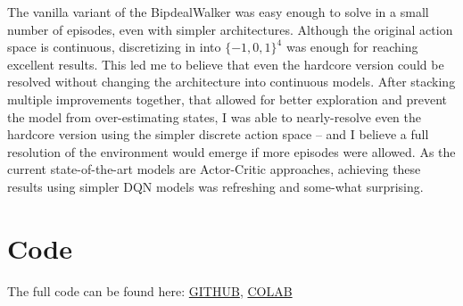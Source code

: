 \documentclass{article}
\begin{document}
\begin{multicols}{2}
The vanilla variant of the BipdealWalker was easy enough to solve in a small number of episodes, even with simpler architectures. Although the original action space is continuous, discretizing in into $\{-1, 0, 1\}^4$ was enough for reaching excellent results. This led me to believe that even the hardcore version could be resolved without changing the architecture into continuous models. After stacking multiple improvements together, that allowed for better exploration and prevent the model from over-estimating states, I was able to nearly-resolve even the hardcore version using the simpler discrete action space -- and I believe a full resolution of the environment would emerge if more episodes were allowed. As the current state-of-the-art models are Actor-Critic approaches, achieving these results using simpler DQN models was refreshing and some-what surprising.

\section{Code}
The full code can be found here:
\href{https://github.com/JudahGazit/reinforcement-learning-project}{GITHUB},
\href{https://colab.research.google.com/drive/1_gxpvbnFv3lCQh4Ce_f1osPcGhwog27W?usp=sharing}{COLAB} 






\end{multicols}
\end{document}
